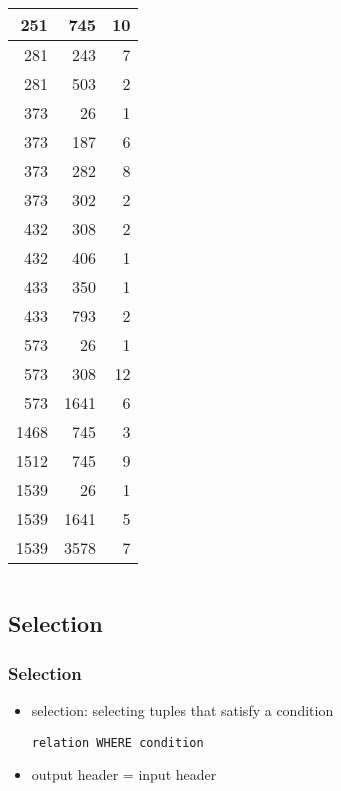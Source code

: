 \documentclass[dvipsnames]{beamer}
\theoremstyle{plain}
\begin{document}
\begin{frame}
\begin{columns}[b]
    \begin{tiny}
    \begin{table}
      \begin{tabular}{|r|r|r|}\hline
    251 &     745 &  10\\\hline
    281 &     243 &   7\\\hline
    281 &     503 &   2\\\hline
    373 &      26 &   1\\\hline
    373 &     187 &   6\\\hline
    373 &     282 &   8\\\hline
    373 &     302 &   2\\\hline
    432 &     308 &   2\\\hline
    432 &     406 &   1\\\hline
    433 &     350 &   1\\\hline
    433 &     793 &   2\\\hline
    573 &      26 &   1\\\hline
    573 &     308 &  12\\\hline
    573 &    1641 &   6\\\hline
   1468 &     745 &   3\\\hline
   1512 &     745 &   9\\\hline
   1539 &      26 &   1\\\hline
   1539 &    1641 &   5\\\hline
   1539 &    3578 &   7\\\hline
      \end{tabular}
    \end{table}
    \end{tiny}
  \end{columns}
\end{frame}

\subsection{Selection}

\begin{frame}[fragile]
  \frametitle{Selection}

  \begin{itemize}
    \item \alert{selection}: selecting tuples that satisfy a condition
    \begin{lstlisting}
relation WHERE condition
    \end{lstlisting}

    \medskip
    \item output header = input header
  \end{itemize}
\end{frame}
\end{document}
